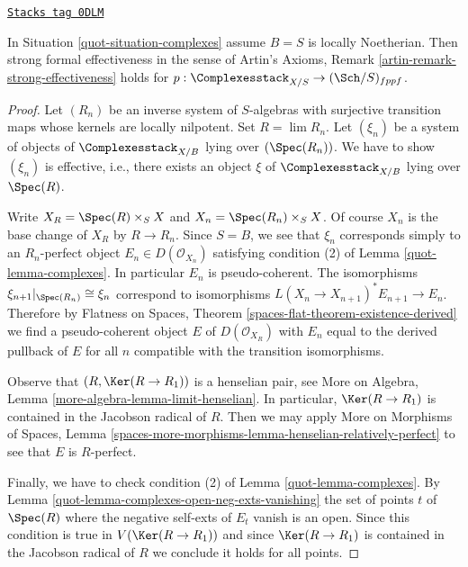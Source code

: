 
\begin{lemma}
\label{quot-lemma-complexes-strong-effectiveness}
\href{https://stacks.math.columbia.edu/tag/0DLM}{\texttt{Stacks tag 0DLM}}

In Situation \ref{quot-situation-complexes} assume $B = S$ is locally Noetherian.
Then strong formal effectiveness in the sense of
Artin's Axioms, Remark \ref{artin-remark-strong-effectiveness}
holds for $p : \Complexesstack_{X/S} \to (\Sch/S)_{fppf}$.
\end{lemma}

\begin{proof}

Let $(R_n)$ be an inverse system of $S$-algebras with surjective transition
maps whose kernels are locally nilpotent. Set $R = \lim R_n$.
Let $(\xi_n)$ be a system of objects of $\Complexesstack_{X/B}$
lying over $(\Spec(R_n))$. We have to show $(\xi_n)$ is effective, i.e.,
there exists an object $\xi$ of $\Complexesstack_{X/B}$ lying over
$\Spec(R)$.

\medskip\noindent
Write $X_R = \Spec(R) \times_S X$ and $X_n = \Spec(R_n) \times_S X$.
Of course $X_n$ is the base change of $X_R$ by $R \to R_n$. Since $S = B$,
we see that $\xi_n$ corresponds simply to an $R_n$-perfect object
$E_n \in D(\mathcal{O}_{X_n})$ satisfying condition (2) of
Lemma \ref{quot-lemma-complexes}. In particular $E_n$ is pseudo-coherent.
The isomorphisms $\xi_{n + 1}|_{\Spec(R_n)} \cong \xi_n$
correspond to isomorphisms $L(X_n \to X_{n + 1})^*E_{n + 1} \to E_n$.
Therefore by
Flatness on Spaces, Theorem \ref{spaces-flat-theorem-existence-derived}
we find a pseudo-coherent object $E$ of $D(\mathcal{O}_{X_R})$
with $E_n$ equal to the derived pullback of $E$ for all $n$
compatible with the transition isomorphisms.

\medskip\noindent
Observe that $(R, \Ker(R \to R_1))$ is a henselian pair, see
More on Algebra, Lemma \ref{more-algebra-lemma-limit-henselian}.
In particular, $\Ker(R \to R_1)$ is contained in the Jacobson radical of $R$.
Then we may apply More on Morphisms of Spaces, Lemma
\ref{spaces-more-morphisms-lemma-henselian-relatively-perfect}
to see that $E$ is $R$-perfect.

\medskip\noindent
Finally, we have to check condition (2) of Lemma \ref{quot-lemma-complexes}.
By Lemma \ref{quot-lemma-complexes-open-neg-exts-vanishing}
the set of points $t$ of $\Spec(R)$ where the negative self-exts of $E_t$
vanish is an open. Since this condition is true in $V(\Ker(R \to R_1))$
and since $\Ker(R \to R_1)$ is contained in the Jacobson radical of $R$
we conclude it holds for all points.
\end{proof}

